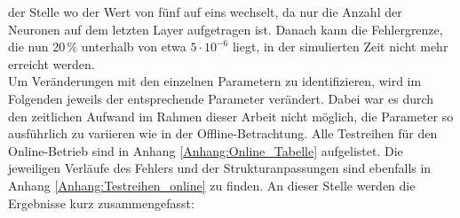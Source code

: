                 der Stelle wo der Wert von fünf auf eins wechselt, da nur die Anzahl der Neuronen auf dem letzten Layer aufgetragen ist. Danach kann 
                die Fehlergrenze, die nun 20\,\% unterhalb von etwa $5 \cdot 10^{-6}$ liegt, in der simulierten Zeit nicht mehr erreicht werden.\\
                Um Veränderungen mit den einzelnen Parametern zu identifizieren, wird im Folgenden jeweils der entsprechende Parameter verändert. Dabei war es durch den zeitlichen 
                Aufwand im Rahmen dieser Arbeit nicht möglich, die Parameter so ausführlich zu variieren wie in der Offline-Betrachtung. Alle Testreihen für den Online-Betrieb sind 
                in Anhang \ref{Anhang:Online_Tabelle} aufgelistet. Die jeweiligen Verläufe des Fehlers und 
                der Strukturanpassungen sind ebenfalls in Anhang \ref{Anhang:Testreihen_online} zu finden. An dieser Stelle werden die Ergebnisse kurz zusammengefasst:
